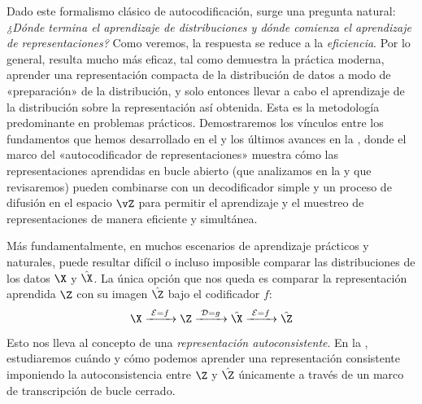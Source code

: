 \documentclass[../../book-main_es.tex]{subfiles}
\begin{document}
Dado este formalismo clásico de autocodificación, surge una pregunta natural:
\textit{¿Dónde termina el aprendizaje de distribuciones y dónde comienza el aprendizaje de representaciones?}
Como veremos, la respuesta se reduce a la \textit{eficiencia}. Por lo general, resulta mucho más
eficaz, tal como demuestra la práctica moderna, aprender una representación compacta
de la distribución de datos a modo de «preparación» de la distribución,
y solo entonces llevar a cabo el aprendizaje de la distribución sobre la representación así obtenida.
Esta es la metodología predominante en problemas prácticos.
Demostraremos los vínculos entre los fundamentos que hemos desarrollado en el
y los últimos avances en la ,
donde el marco del «autocodificador de representaciones» muestra cómo las representaciones aprendidas en bucle abierto
(que analizamos en la  y que
revisaremos)
pueden combinarse con un decodificador simple y un proceso de difusión en el espacio $\vZ$ para
permitir el aprendizaje y el muestreo de representaciones de manera eficiente y simultánea.

Más fundamentalmente, en muchos escenarios de aprendizaje prácticos y naturales,
puede resultar difícil o incluso imposible comparar las distribuciones de
los datos $\X$ y $\hat \X$. La única opción que nos queda es
comparar la representación aprendida $\Z$ con su imagen $\hat \Z$ bajo el
codificador $f$:
\begin{equation}
    \X
    \xrightarrow{\hspace{1mm} \mathcal{E} = f \hspace{1mm}} \Z
    \xrightarrow{\hspace{1mm} \mathcal{D} = g \hspace{1mm}} \hat{\X}
    \xrightarrow{\hspace{1mm} \mathcal{E} = f \hspace{1mm}} \hat \Z
\end{equation}
Esto nos lleva al concepto de una {\em representación autoconsistente}.
En la , estudiaremos cuándo y cómo podemos
aprender una representación consistente imponiendo la autoconsistencia
entre $\Z$ y $\hat \Z$ únicamente a través de un marco de transcripción de bucle cerrado.
\end{document}
